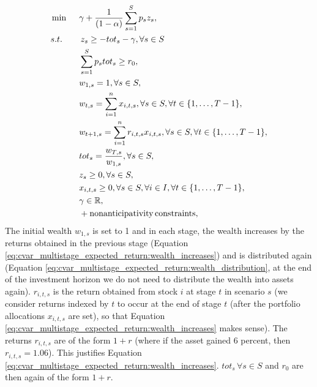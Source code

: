 \begin{alignat}{10}
& \min \, \, \, && \gamma + \frac{1}{(1-\alpha)} \sum_{s=1}^S p_s z_s, \label{eq:cvar_multistage_expected_return}  \\
&s.t. && \, z_s \geq  -tot_s -\gamma, \forall s \in S \nonumber \\
&  && \sum_{s=1}^{S} p_s tot_s \geq r_0, \nonumber \\
& && w_{1,s}=1, \forall s \in S, \nonumber \\
& && w_{t,s}=\sum_{i=1}^{n} x_{i,t,s}, \forall s \in S, \forall t \in \{1,\dots,T-1\}, \label{eq:cvar_multistage_expected_return:wealth_distribution} \\
& && w_{t+1,s}=\sum_{i=1}^{n} r_{i,t,s} x_{i,t,s}, \forall s \in S, \forall t \in \{1,\dots ,T-1\}, \label{eq:cvar_multistage_expected_return:wealth_increases} \\
& && tot_s = \frac{w_{T,s}}{w_{1,s}}, \forall s \in S, \nonumber \\
& && z_s \geq 0, \forall s \in S, \nonumber \\
& && x_{i,t,s} \geq 0, \forall s \in S, \forall i \in I, \forall t \in \{1,\dots ,T-1\}, \nonumber \\
& && \gamma \in \R ,\nonumber \\
& && + \mathrm{nonanticipativity \, constraints}, \nonumber
\end{alignat}
The initial wealth $w_{1,s}$ is set to 1 and in each stage, the wealth increases by the returns obtained in the previous stage (Equation \ref{eq:cvar_multistage_expected_return:wealth_increases}) and is distributed again (Equation \ref{eq:cvar_multistage_expected_return:wealth_distribution}, at the end of the investment horizon we do not need to distribute the wealth into assets again). $r_{i,t,s}$ is the return obtained from stock $i$ at stage $t$ in scenario $s$ (we consider returns indexed by $t$ to occur at the end of stage $t$ (after the portfolio allocations $x_{i,t,s}$ are set), so that Equation \ref{eq:cvar_multistage_expected_return:wealth_increases} makes sense). The returns $r_{i,t,s}$ are of the form $1+r$ (where if the asset gained 6 percent, then $r_{i,t,s}=1.06$). This justifies Equation \ref{eq:cvar_multistage_expected_return:wealth_increases}. $tot_s \, \forall s \in S$ and $r_0$ are then again of the form $1+r$.

